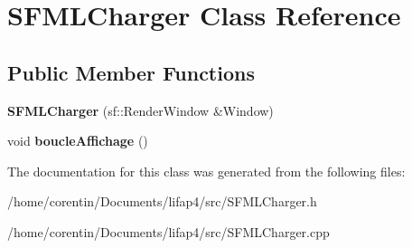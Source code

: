 \hypertarget{class_s_f_m_l_charger}{}\section{S\+F\+M\+L\+Charger Class Reference}
\label{class_s_f_m_l_charger}
\subsection*{Public Member Functions}
\begin{DoxyCompactItemize}
\item 
\mbox{\label{class_s_f_m_l_charger_a2b47aabcd697f29be30d47d84321ba7e}} 
{\bfseries S\+F\+M\+L\+Charger} (sf\+::\+Render\+Window \&Window)
\item 
\mbox{\label{class_s_f_m_l_charger_ae0c05ca2ca2080579fe94cc5e8f8b00c}} 
void {\bfseries boucle\+Affichage} ()
\end{DoxyCompactItemize}


The documentation for this class was generated from the following files\+:\begin{DoxyCompactItemize}
\item 
/home/corentin/\+Documents/lifap4/src/S\+F\+M\+L\+Charger.\+h\item 
/home/corentin/\+Documents/lifap4/src/S\+F\+M\+L\+Charger.\+cpp\end{DoxyCompactItemize}
